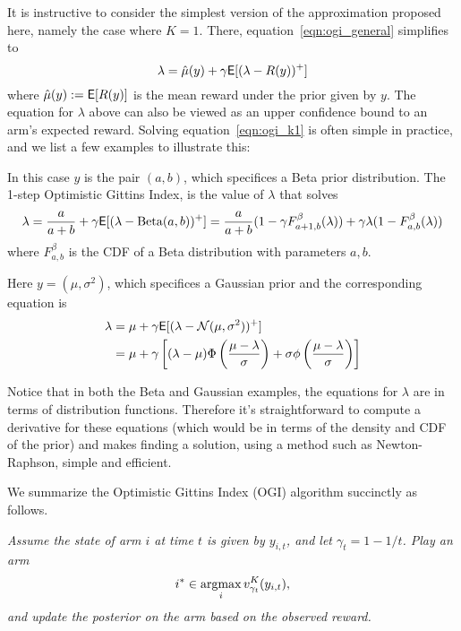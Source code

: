 It is instructive to consider the simplest version of the approximation proposed here, namely the case where $K=1$. There, equation~\eqref{eqn:ogi_general} simplifies to
\begin{equation} \label{eqn:ogi_k1}
\lambda = \hat \mu(y) + \gamma \mathsf{E}[(\lambda - R(y))^+]
\end{equation}
where $\hat \mu(y) := \mathsf{E}[R(y)]$ is the mean reward under the prior given by $y$. The equation for $\lambda$ above can also be viewed as an upper confidence bound to an arm's expected reward. Solving equation~\eqref{eqn:ogi_k1} is often simple in practice, and we list a few examples to illustrate this:
\begin{example}[Beta]
	In this case $y$ is the pair $(a,b)$, which specifices a Beta prior distribution. The 1-step Optimistic Gittins Index, is the value of $\lambda$ that solves
	\begin{align*}
	\lambda = \frac{a}{a+b} + \gamma \mathsf{E}[(\lambda - {\rm Beta}(a,b))^+] =  \frac{a}{a+b}(1 - \gamma F^\beta_{a+1,b}(\lambda)) + \gamma \lambda (1-F^\beta_{a,b}(\lambda))
	\end{align*}
	where $F^\beta_{a,b}$ is the CDF of a Beta distribution with parameters $a, b$.
\end{example}

\begin{example}[Gaussian]
	Here $y = (\mu,\sigma^2)$, which specifices a Gaussian prior and the corresponding equation is
	\begin{align*}
	\lambda & = \mu  + \gamma \mathsf{E}[(\lambda - {\rm \mathcal{N}}(\mu,\sigma^2))^+]  \\
	& = \mu + \gamma \left[( \lambda - \mu) \Phi\left(\frac{\mu - \lambda}{\sigma}\right) + \sigma\phi\left(\frac{\mu-\lambda}{\sigma}\right) \right]
	\end{align*}
\end{example}

Notice that in both the Beta and Gaussian examples, the equations for $\lambda$ are in terms of distribution functions. Therefore it's straightforward to compute a derivative for these equations (which would be in terms of the density and CDF of the prior) and makes finding a solution, using a method such as Newton-Raphson, simple and efficient.

We summarize the Optimistic Gittins Index (OGI) algorithm succinctly as follows. 

{\em Assume the state of arm $i$ at time $t$ is given by $y_{i,t}$, and let $\gamma_t = 1-1/t$. Play an arm 
	$$i^* \in \operatorname*{\mathrm{argmax}}_i v^K_{\gamma_t}(y_{i,t}),$$ 
	and update the posterior on the arm based on the observed reward.}

